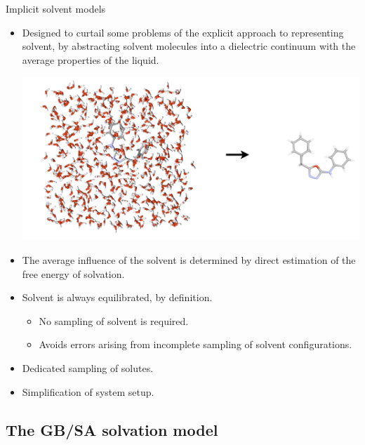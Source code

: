 \documentclass[10pt]{beamer}
\begin{document}
\begin{frame}[t]{Implicit solvent models}

\begin{itemize}
    \item Designed to curtail some problems of the explicit approach to representing solvent, by abstracting solvent molecules into a dielectric continuum with the average properties of the liquid.
	\begin{center}
	\includegraphics[scale=0.2]{figures/implicit.png}
	\end{center}
	\item The average influence of the solvent is determined by direct estimation of the free energy of solvation.
	\item Solvent is always equilibrated, by definition.
	\begin{itemize}
    \item No sampling of solvent is required.
    \item Avoids errors arising from incomplete sampling of solvent configurations.
    \end{itemize}
    \item Dedicated sampling of solutes.
    \item Simplification of system setup.
\end{itemize}
\end{frame}


\subsection{The GB/SA solvation model}
\end{document}
